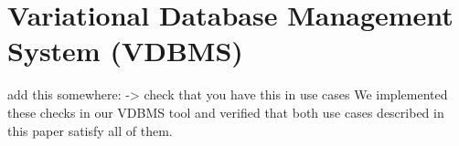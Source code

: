 \chapter{Variational Database Management System (VDBMS)}
\label{ch:vdbms}

add this somewhere: -> check that you have this in use cases
We implemented these checks in our VDBMS tool and verified that both use cases
described in this paper satisfy all of them. 


